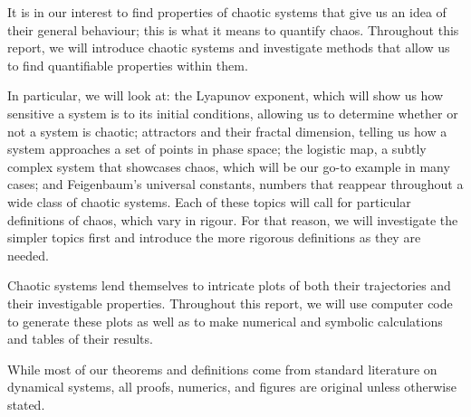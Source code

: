 It is in our interest to find properties of chaotic systems that give us an idea of their general behaviour; this is what it means to quantify chaos. Throughout this report, we will introduce chaotic systems and investigate methods that allow us to find quantifiable properties within them. 

In particular, we will look at: the Lyapunov exponent, which will show us how sensitive a system is to its initial conditions, allowing us to determine whether or not a system is chaotic; attractors and their fractal dimension, telling us how a system approaches a set of points in phase space; the logistic map, a subtly complex system that showcases chaos, which will be our go-to example in many cases; and Feigenbaum's universal constants, numbers that reappear throughout a wide class of chaotic systems. Each of these topics will call for particular definitions of chaos, which vary in rigour. For that reason, we will investigate the simpler topics first and introduce the more rigorous definitions as they are needed.

Chaotic systems lend themselves to intricate plots of both their trajectories and their investigable properties. Throughout this report, we will use computer code to generate these plots as well as to make numerical and symbolic calculations and tables of their results. 

While most of our theorems and definitions come from standard literature on dynamical systems, all proofs, numerics, and figures are original unless otherwise stated.
